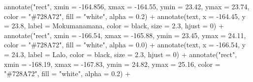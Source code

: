 \documentclass[
]{article}
\newenvironment{Shaded}{\begin{snugshade}}{\end{snugshade}}
\newcommand{\AttributeTok}[1]{\textcolor[rgb]{0.77,0.63,0.00}{#1}}
\newcommand{\DecValTok}[1]{\textcolor[rgb]{0.00,0.00,0.81}{#1}}
\newcommand{\FloatTok}[1]{\textcolor[rgb]{0.00,0.00,0.81}{#1}}
\newcommand{\FunctionTok}[1]{\textcolor[rgb]{0.00,0.00,0.00}{#1}}
\newcommand{\NormalTok}[1]{#1}
\newcommand{\SpecialCharTok}[1]{\textcolor[rgb]{0.00,0.00,0.00}{#1}}
\newcommand{\StringTok}[1]{\textcolor[rgb]{0.31,0.60,0.02}{#1}}
\begin{document}
\begin{Shaded}
\begin{Highlighting}[]
  \FunctionTok{annotate}\NormalTok{(}\StringTok{"rect"}\NormalTok{, }\AttributeTok{xmin =} \SpecialCharTok{{-}}\FloatTok{164.856}\NormalTok{, }\AttributeTok{xmax =} \SpecialCharTok{{-}}\FloatTok{164.55}\NormalTok{, }\AttributeTok{ymin =} \FloatTok{23.42}\NormalTok{, }\AttributeTok{ymax =} \FloatTok{23.74}\NormalTok{, }
           \AttributeTok{color =} \StringTok{"\#728A72"}\NormalTok{, }\AttributeTok{fill =} \StringTok{"white"}\NormalTok{, }\AttributeTok{alpha =} \FloatTok{0.2}\NormalTok{) }\SpecialCharTok{+}
  \FunctionTok{annotate}\NormalTok{(}\StringTok{\textquotesingle{}text\textquotesingle{}}\NormalTok{, }\AttributeTok{x =} \SpecialCharTok{{-}}\FloatTok{164.45}\NormalTok{, }\AttributeTok{y =} \FloatTok{23.8}\NormalTok{, }
           \AttributeTok{label =} \StringTok{\textquotesingle{}Mokumanamana\textquotesingle{}}\NormalTok{, }\AttributeTok{color =} \StringTok{\textquotesingle{}black\textquotesingle{}}\NormalTok{, }\AttributeTok{size =} \FloatTok{2.3}\NormalTok{, }\AttributeTok{hjust =} \DecValTok{0}\NormalTok{) }\SpecialCharTok{+}
  \FunctionTok{annotate}\NormalTok{(}\StringTok{"rect"}\NormalTok{, }\AttributeTok{xmin =} \SpecialCharTok{{-}}\FloatTok{166.54}\NormalTok{, }\AttributeTok{xmax =} \SpecialCharTok{{-}}\FloatTok{165.88}\NormalTok{, }\AttributeTok{ymin =} \FloatTok{23.45}\NormalTok{, }\AttributeTok{ymax =} \FloatTok{24.11}\NormalTok{, }
           \AttributeTok{color =} \StringTok{"\#728A72"}\NormalTok{, }\AttributeTok{fill =} \StringTok{"white"}\NormalTok{, }\AttributeTok{alpha =} \FloatTok{0.0}\NormalTok{) }\SpecialCharTok{+}
  \FunctionTok{annotate}\NormalTok{(}\StringTok{\textquotesingle{}text\textquotesingle{}}\NormalTok{, }\AttributeTok{x =} \SpecialCharTok{{-}}\FloatTok{166.54}\NormalTok{, }\AttributeTok{y =} \FloatTok{24.3}\NormalTok{, }
           \AttributeTok{label =} \StringTok{\textquotesingle{}Lalo\textquotesingle{}}\NormalTok{, }\AttributeTok{color =} \StringTok{\textquotesingle{}black\textquotesingle{}}\NormalTok{, }\AttributeTok{size =} \FloatTok{2.3}\NormalTok{, }\AttributeTok{hjust =} \DecValTok{0}\NormalTok{) }\SpecialCharTok{+}
  \FunctionTok{annotate}\NormalTok{(}\StringTok{"rect"}\NormalTok{, }\AttributeTok{xmin =} \SpecialCharTok{{-}}\FloatTok{168.19}\NormalTok{, }\AttributeTok{xmax =} \SpecialCharTok{{-}}\FloatTok{167.83}\NormalTok{, }\AttributeTok{ymin =} \FloatTok{24.82}\NormalTok{, }\AttributeTok{ymax =} \FloatTok{25.16}\NormalTok{, }
           \AttributeTok{color =} \StringTok{"\#728A72"}\NormalTok{, }\AttributeTok{fill =} \StringTok{"white"}\NormalTok{, }\AttributeTok{alpha =} \FloatTok{0.2}\NormalTok{) }\SpecialCharTok{+}

\end{Highlighting}
\end{Shaded}
\end{document}
